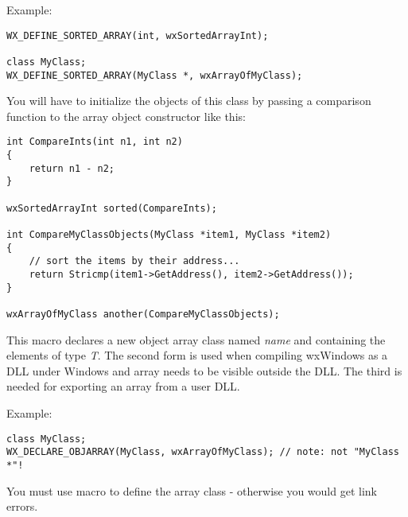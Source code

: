 Example:

\begin{verbatim}
WX_DEFINE_SORTED_ARRAY(int, wxSortedArrayInt);

class MyClass;
WX_DEFINE_SORTED_ARRAY(MyClass *, wxArrayOfMyClass);
\end{verbatim}

You will have to initialize the objects of this class by passing a comparison
function to the array object constructor like this:

\begin{verbatim}
int CompareInts(int n1, int n2)
{
    return n1 - n2;
}

wxSortedArrayInt sorted(CompareInts);

int CompareMyClassObjects(MyClass *item1, MyClass *item2)
{
    // sort the items by their address...
    return Stricmp(item1->GetAddress(), item2->GetAddress());
}

wxArrayOfMyClass another(CompareMyClassObjects);
\end{verbatim}

\label{wxdeclareobjarray}




This macro declares a new object array class named {\it name} and containing
the elements of type {\it T}. The second form is used when compiling wxWindows as
a DLL under Windows and array needs to be visible outside the DLL.  The third is
needed for exporting an array from a user DLL.

Example:

\begin{verbatim}
class MyClass;
WX_DECLARE_OBJARRAY(MyClass, wxArrayOfMyClass); // note: not "MyClass *"!
\end{verbatim}

You must use  macro to define
the array class - otherwise you would get link errors.

\label{wxdefineobjarray}




